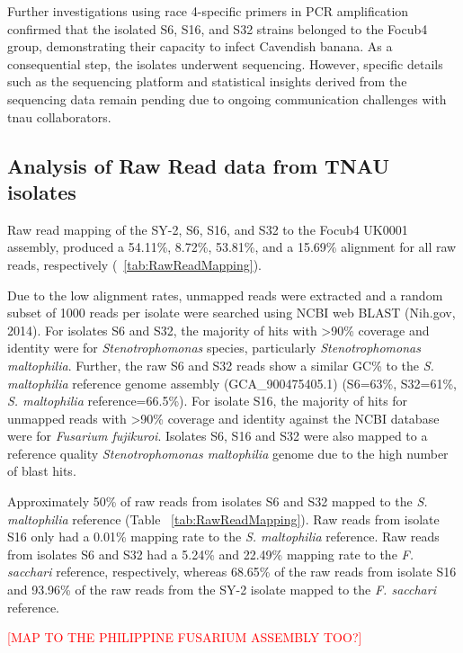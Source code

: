 Further investigations using race 4-specific primers in PCR amplification confirmed that the isolated S6, S16, and S32 strains belonged to the \acs{Focub4} group, demonstrating their capacity to infect Cavendish banana. As a consequential step, the isolates underwent sequencing. However, specific details such as the sequencing platform and statistical insights derived from the sequencing data remain pending due to ongoing communication challenges with \ac{tnau} collaborators.

\subsection{Analysis of Raw Read data from TNAU isolates}

Raw read mapping of the SY-2, S6, S16, and S32 to the \ac{Focub4} UK0001 assembly, produced a 54.11\%, 8.72\%, 53.81\%, and a 15.69\% alignment for all raw reads, respectively (~\ref{tab:RawReadMapping}). 

Due to the low alignment rates, unmapped reads were extracted and a random subset of 1000 reads per isolate were searched using NCBI web BLAST (Nih.gov, 2014). For isolates S6 and S32, the majority of hits with >90\% coverage and identity were for \textit{Stenotrophomonas} species, particularly \textit{Stenotrophomonas maltophilia}. Further, the raw S6 and S32 reads show a similar GC\% to the \textit{S. maltophilia }reference genome assembly (GCA\_900475405.1) (S6=63\%, S32=61\%, \textit{S. maltophilia} reference=66.5\%). For isolate S16, the majority of hits for unmapped reads with >90\% coverage and identity against the NCBI database were for \textit{Fusarium fujikuroi}. Isolates S6, S16 and S32 were also mapped to a reference quality \textit{Stenotrophomonas maltophilia} genome due to the high number of blast hits. 

Approximately 50\% of raw reads from isolates S6 and S32 mapped to the \textit{S. maltophilia} reference (Table ~\ref{tab:RawReadMapping}). Raw reads from isolate S16 only had a 0.01\% mapping rate to the \textit{S. maltophilia} reference. Raw reads from isolates S6 and S32 had a 5.24\% and 22.49\% mapping rate to the \textit{F. sacchari} reference, respectively, whereas 68.65\% of the raw reads from isolate S16 and 93.96\% of the raw reads from the SY-2 isolate mapped to the \textit{F. sacchari} reference.

\textcolor{red}{[MAP TO THE PHILIPPINE FUSARIUM ASSEMBLY TOO?]}



